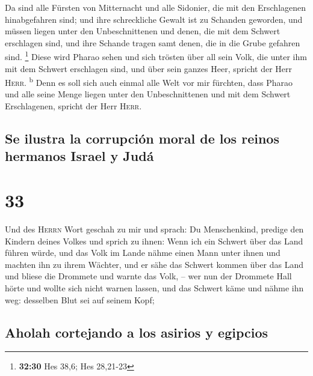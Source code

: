  Da sind alle Fürsten von Mitternacht und alle Sidonier,
die mit den Erschlagenen hinabgefahren sind; und ihre schreckliche
Gewalt ist zu Schanden geworden, und müssen liegen unter den
Unbeschnittenen und denen, die mit dem Schwert erschlagen sind, und ihre
Schande tragen samt denen, die in die Grube gefahren sind. \footnote{\textbf{32:30}
  Hes 38,6; Hes 28,21-23}  Diese wird Pharao sehen und
sich trösten über all sein Volk, die unter ihm mit dem Schwert
erschlagen sind, und über sein ganzes Heer, spricht der Herr
\textsc{Herr}. \textsuperscript{b}  Denn es soll sich
auch einmal alle Welt vor mir fürchten, dass Pharao und alle seine Menge
liegen unter den Unbeschnittenen und mit dem Schwert Erschlagenen,
spricht der Herr \textsc{Herr}.

\hypertarget{se-ilustra-la-corrupciuxf3n-moral-de-los-reinos-hermanos-israel-y-juduxe1}{%
\subsection{Se ilustra la corrupción moral de los reinos hermanos Israel
y
Judá}\label{se-ilustra-la-corrupciuxf3n-moral-de-los-reinos-hermanos-israel-y-juduxe1}}

\hypertarget{section-32}{%
\section{33}\label{section-32}}

 Und des \textsc{Herrn} Wort geschah zu mir und sprach:
 Du Menschenkind, predige den Kindern deines Volkes und
sprich zu ihnen: Wenn ich ein Schwert über das Land führen würde, und
das Volk im Lande nähme einen Mann unter ihnen und machten ihn zu ihrem
Wächter,  und er sähe das Schwert kommen über das Land und
bliese die Drommete und warnte das Volk, --  wer nun der
Drommete Hall hörte und wollte sich nicht warnen lassen, und das Schwert
käme und nähme ihn weg: desselben Blut sei auf seinem Kopf;

\hypertarget{aholah-cortejando-a-los-asirios-y-egipcios}{%
\subsection{Aholah cortejando a los asirios y
egipcios}\label{aholah-cortejando-a-los-asirios-y-egipcios}}

